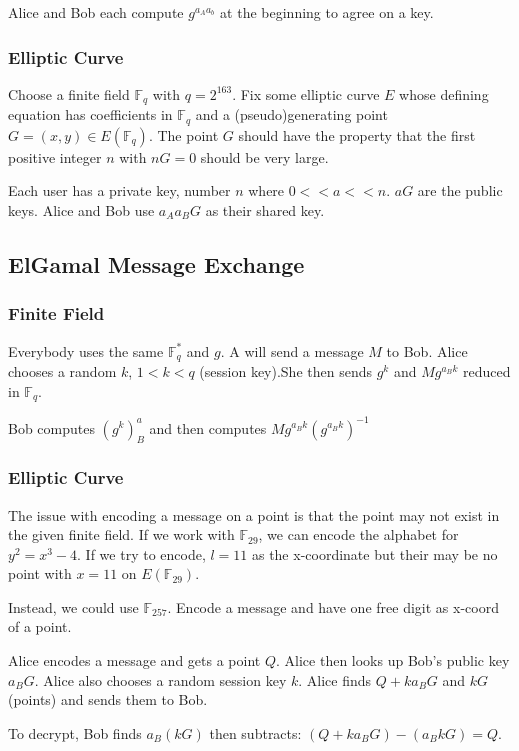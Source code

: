 \documentclass{article}
\begin{document}
Alice and Bob each compute $g^{a_Aa_b}$ at the beginning to agree on a key.

\subsubsection{Elliptic Curve}
Choose a finite field $\mathbb{F}_q$ with $q=2^{163}$. Fix some elliptic curve
$E$ whose defining equation has coefficients in $\mathbb{F}_q$ and a
(pseudo)generating point $G=(x,y) \in E(\mathbb{F}_q)$. The point $G$ should
have the property that the first positive integer $n$ with $nG=0$ should be
very large.

Each user has a private key, number $n$ where $0 << a << n$. $aG$ are the
public keys. Alice and Bob use $a_Aa_BG$ as their shared key.

\subsection{ElGamal Message Exchange}
\subsubsection{Finite Field}
Everybody uses the same $\mathbb{F}_q^*$ and $g$. A will send a message $M$ to
Bob. Alice chooses a random $k$, $1<k<q$ (session key).She then sends $g^k$ and
$Mg^{a_Bk}$ reduced in $\mathbb{F}_q$.

Bob computes $(g^k)^a_B$ and then computes $Mg^{a_Bk}(g^{a_Bk})^{-1}$

\subsubsection{Elliptic Curve}
The issue with encoding a message on a point is that the point may not exist in
the given finite field. If we work with $\mathbb{F}_{29}$, we can encode the
alphabet for $y^2=x^3-4$. If we try to encode, $l=11$ as the x-coordinate but
their may be no point with $x=11$ on $E(\mathbb{F}_{29})$.

Instead, we could use $\mathbb{F}_{257}$. Encode a message and have one free
digit as x-coord of a point.

Alice encodes a message and gets a point $Q$. Alice then looks up Bob's public
key $a_BG$. Alice also chooses a random session key $k$. Alice finds $Q+ka_BG$
and $kG$ (points) and sends them to Bob.

To decrypt, Bob finds $a_B(kG)$ then subtracts: $(Q+ka_BG)-(a_BkG)=Q$.
\end{document}
